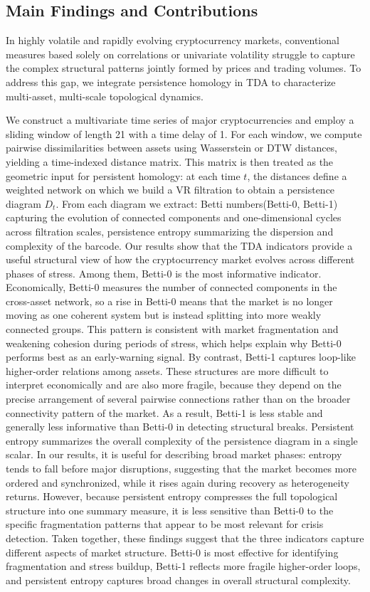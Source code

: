 \documentclass[11pt,reqno]{amsart}
\numberwithin{equation}{section} %
\begin{document}
\subsection{Main Findings and Contributions}
In highly volatile and rapidly evolving cryptocurrency markets, conventional measures based solely on correlations or univariate volatility struggle to capture the complex structural patterns jointly formed by prices and trading volumes. To address this gap, we integrate persistence homology in TDA  to characterize multi-asset, multi-scale topological dynamics.

We construct a multivariate time series of major cryptocurrencies and employ a sliding window of length 21 with a time delay of 1. 
For each window, we compute pairwise dissimilarities between assets using Wasserstein or DTW distances, yielding a time-indexed distance matrix. 
This matrix is then treated as the geometric input for persistent homology: at each time $t$, the distances define a weighted network on which we build a VR filtration to obtain a persistence diagram $D_t$. 
From each diagram we extract: Betti numbers(Betti-0, Betti-1) capturing the evolution of connected components and one-dimensional cycles across filtration scales, persistence entropy summarizing the dispersion and complexity of the barcode. 
Our results show that the TDA indicators provide a useful structural view of how the cryptocurrency market evolves across different phases of stress. Among them, Betti-0 is the most informative indicator. Economically, Betti-0 measures the number of connected components in the cross-asset network, so a rise in Betti-0 means that the market is no longer moving as one coherent system but is instead splitting into more weakly connected groups. This pattern is consistent with market fragmentation and weakening cohesion during periods of stress, which helps explain why Betti-0 performs best as an early-warning signal.
By contrast, Betti-1 captures loop-like higher-order relations among assets. These structures are more difficult to interpret economically and are also more fragile, because they depend on the precise arrangement of several pairwise connections rather than on the broader connectivity pattern of the market. 
As a result, Betti-1 is less stable and generally less informative than Betti-0 in detecting structural breaks.
Persistent entropy summarizes the overall complexity of the persistence diagram in a single scalar. In our results, it is useful for describing broad market phases: entropy tends to fall before major disruptions, suggesting that the market becomes more ordered and synchronized, while it rises again during recovery as heterogeneity returns. 
However, because persistent entropy compresses the full topological structure into one summary measure, it is less sensitive than Betti-0 to the specific fragmentation patterns that appear to be most relevant for crisis detection.
Taken together, these findings suggest that the three indicators capture different aspects of market structure. 
Betti-0 is most effective for identifying fragmentation and stress buildup, Betti-1 reflects more fragile higher-order loops, and persistent entropy captures broad changes in overall structural complexity.
\end{document}
